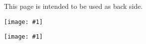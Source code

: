 \documentclass{article}
\newcommand{\img}[2]{
  \begin{center}
  \texttt{[image: \#1]}
  \end{center}
}
\begin{document}
  This page is intended to be used as back side.
  \img{1024.png}{0.35}
  \img{5210.png}{0.5}
\end{document}
